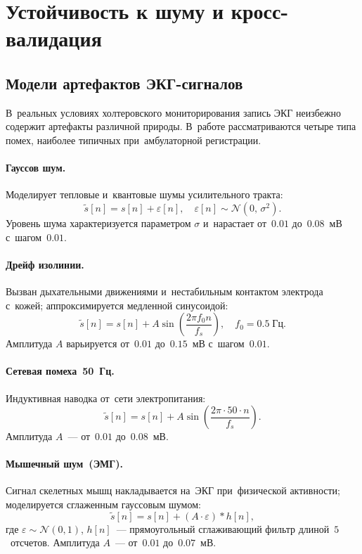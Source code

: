 \section{Устойчивость к шуму и кросс-валидация}
\label{sec:Chapter4}

\subsection{Модели артефактов ЭКГ-сигналов}

В~реальных условиях холтеровского мониторирования запись ЭКГ
неизбежно содержит артефакты различной природы.
В~работе рассматриваются четыре типа помех, наиболее типичных
при~амбулаторной регистрации.

\paragraph{Гауссов шум.}
Моделирует тепловые и~квантовые шумы усилительного тракта:
\begin{equation}
    \tilde{s}[n] = s[n] + \varepsilon[n],\quad
    \varepsilon[n] \sim \mathcal{N}(0,\,\sigma^2).
\end{equation}
Уровень шума характеризуется параметром $\sigma$ и~нарастает
от~$0.01$ до~$0.08$~мВ с~шагом~$0.01$.

\paragraph{Дрейф изолинии.}
Вызван дыхательными движениями и~нестабильным контактом
электрода с~кожей; аппроксимируется медленной синусоидой:
\begin{equation}
    \tilde{s}[n] = s[n] + A\sin\!\left(\frac{2\pi f_0 n}{f_s}\right),
    \quad f_0 = 0.5\;\text{Гц}.
\end{equation}
Амплитуда $A$ варьируется от~$0.01$ до~$0.15$~мВ с~шагом~$0.01$.

\paragraph{Сетевая помеха~50~Гц.}
Индуктивная наводка от~сети электропитания:
\begin{equation}
    \tilde{s}[n] = s[n] + A\sin\!\left(\frac{2\pi \cdot 50 \cdot n}{f_s}\right).
\end{equation}
Амплитуда $A$~--- от~$0.01$ до~$0.08$~мВ.

\paragraph{Мышечный шум~(ЭМГ).}
Сигнал скелетных мышц накладывается на~ЭКГ при~физической
активности; моделируется сглаженным гауссовым шумом:
\begin{equation}
    \tilde{s}[n] = s[n] + (A \cdot \varepsilon) * h[n],
\end{equation}
где $\varepsilon \sim \mathcal{N}(0,1)$, $h[n]$~--- прямоугольный
сглаживающий фильтр длиной~$5$~отсчетов.
Амплитуда $A$~--- от~$0.01$ до~$0.07$~мВ.

